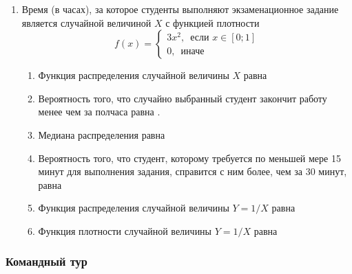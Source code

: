 \begin{enumerate}
\item Время (в часах), за которое студенты выполняют экзаменационное задание
является случайной величиной $X$ с функцией плотности
\[
f(x)=\begin{cases}
3x^2, \, \text{ если } x \in [0;1] \\
0, \, \text{ иначе }
\end{cases}
\]

\begin{enumerate}
\item Функция распределения случайной величины $X$ равна \underline{\hspace{2cm}}
\item Вероятность того, что случайно выбранный студент закончит работу менее чем
за полчаса равна \underline{\hspace{2cm}}.
\item Медиана распределения равна \underline{\hspace{2cm}}
\item Вероятность того, что студент, которому требуется по меньшей мере 15 минут
для выполнения задания, справится с ним более, чем за 30 минут, равна \underline{\hspace{2cm}}
\item Функция распределения случайной величины $Y=1/X$ равна \underline{\hspace{2cm}}
\item Функция плотности случайной величины $Y=1/X$ равна \underline{\hspace{2cm}}
\end{enumerate}
\end{enumerate}

\subsubsection*{Командный тур}

